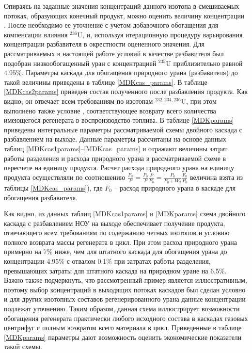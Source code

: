 Опираясь на заданные значения концентраций данного изотопа в смешиваемых потоках, образующих конечный продукт, можно оценить величину концентрации . После необходимо ее уточнение с учетом добавочного обогащения для компенсации влияния $^{236}$U, и, используя итерационную процедуру варьирования концентрации разбавителя в окрестности оцененного значения. Для рассматриваемых в настоящей работе условий в качестве разбавителя был подобран низкообогащенный уран с концентрацией $^{235}$U  приблизительно равной 4.95\%. Параметры каскада для обогащения природного урана (разбавителя) до такой величины приведены в таблице \ref{MDKcas_params}. В таблице \ref{MDKcas2params} приведен состав полученного после разбавления продукта. Как видно, он отвечает всем требованиям по изотопам $^{232,234,236}$U, при этом выполнено также условие , соответствующее возврату всего количества имеющегося регенерата в воспроизводство топлива. В таблице \ref{MDKparams} приведены интегральные параметры рассматриваемой схемы двойного каскада с разбавлением на выходе. Данные параметры рассчитаны на основе данных таблиц \ref{MDKcas1params}--\ref{MDKcas_params} и отражают величины затрат работы разделения и расхода природного урана в рассматриваемой схеме в пересчете на единицу продукта. Расчет расхода природного урана на единицу продукта осуществляли по соотношению $\frac{F_{0}}{P}=\frac{P_{0}}{P} \frac{P}{P_{0}}=\frac{P_{0}}{P_{0}+W_{2}} \frac{F_{0}}{P_{0}}$ величина взята из таблицы \ref{MDKcas_params}), где $F_{0}$ -- расход природного урана в каскаде для обогащения разбавителя.

Как видно, из данных таблиц \ref{MDKcas1params} и \ref{MDKparams} схема двойного каскада с разбавлением НОУ на выходе обеспечивает получение продукта, отвечающего всем требованиям по содержанию четных изотопов и условию полного возврата массы регенерата в цикл. При этом расход природного урана примерно на 7\% ниже, чем для штатного каскада для обогащения урана до концентрации 4.95\% с отвалом 0.1\% при затратах работы разделения, превышающих затраты для штатного каскада на природном уране на 6,5\%. Важно также подчеркнуть, что рассмотренный пример является иллюстративным, поэтому выбор концентраций в выходящих потоках каскадов был сделан условно и для других изотопных составов регенерированного урана данные концентрации подлежат уточнению. Таким образом, данная схема иллюстрирует возможности обогащения регенерата практически любого исходного состава в каскадах газовых центрифуг с полным возвратом всего материала в цикл. Приведенные в таблице \ref{MDKparams} параметры дают возможность оценить экономические показатели такой схемы.

